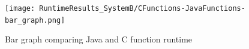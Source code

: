 \documentclass{article}
\begin{document}
\begin{figure}[H]
	\centering
	\texttt{[image: RuntimeResults\_SystemB/CFunctions-JavaFunctions-bar\_graph.png]}
	\caption{Bar graph comparing Java and C function runtime}
	\label{fig:bar-graph||SystemB}
\end{figure}




\end{document}
